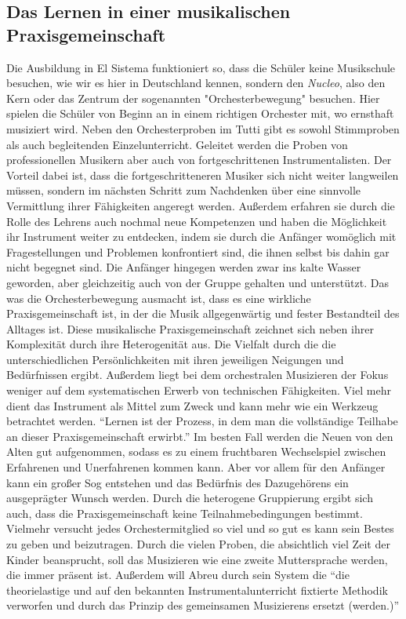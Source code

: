 \subsection{Das Lernen in einer musikalischen Praxisgemeinschaft}
Die Ausbildung in El Sistema funktioniert so, dass die Schüler keine Musikschule
besuchen, wie wir es hier in Deutschland kennen, sondern den \emph{Nucleo}, also den Kern oder das Zentrum der sogenannten "Orchesterbewegung" besuchen. Hier
spielen die Schüler von Beginn an in einem richtigen Orchester mit, wo
ernsthaft musiziert wird. Neben den Orchesterproben im Tutti gibt es sowohl
Stimmproben als auch begleitenden Einzelunterricht. Geleitet werden die Proben
von professionellen Musikern aber auch von fortgeschrittenen Instrumentalisten.
\autocite[45]{kaufmann:el_sistema} Der Vorteil dabei ist, dass die
fortgeschritteneren Musiker sich nicht weiter langweilen müssen, sondern im
nächsten Schritt zum Nachdenken über eine sinnvolle Vermittlung ihrer
Fähigkeiten angeregt werden. Außerdem erfahren sie durch die Rolle des Lehrens
auch nochmal neue Kompetenzen und haben die Möglichkeit ihr Instrument weiter zu
entdecken, indem sie durch die Anfänger womöglich mit Fragestellungen und
Problemen konfrontiert sind, die ihnen selbst bis dahin gar nicht begegnet sind.
Die Anfänger hingegen werden zwar ins kalte Wasser geworden, aber gleichzeitig
auch von der Gruppe gehalten und unterstützt.
Das was die Orchesterbewegung ausmacht ist, dass es eine wirkliche
Praxisgemeinschaft ist, in der die Musik allgegenwärtig und fester
Bestandteil des Alltages ist. Diese musikalische Praxisgemeinschaft zeichnet
sich neben ihrer Komplexität durch ihre Heterogenität aus. Die Vielfalt durch
die die unterschiedlichen Persönlichkeiten mit ihren jeweiligen Neigungen und
Bedürfnissen ergibt. %
Außerdem liegt bei dem orchestralen Musizieren der Fokus weniger auf dem
systematischen Erwerb von technischen Fähigkeiten. Viel mehr dient das
Instrument als Mittel zum Zweck und kann mehr wie ein Werkzeug betrachtet
werden. \enquote{Lernen ist der Prozess, in dem man die vollständige Teilhabe an dieser
Praxisgemeinschaft erwirbt.} Im besten Fall werden die Neuen von den Alten gut
aufgenommen, sodass es zu einem fruchtbaren Wechselspiel zwischen Erfahrenen und
Unerfahrenen kommen kann. Aber vor allem für den Anfänger kann ein großer Sog
entstehen und das Bedürfnis des Dazugehörens ein ausgeprägter Wunsch werden.
Durch die heterogene Gruppierung ergibt sich auch, dass die Praxisgemeinschaft
keine Teilnahmebedingungen bestimmt. Vielmehr versucht jedes Orchestermitglied
so viel und so gut es kann sein Bestes zu geben und beizutragen. Durch die
vielen Proben, die absichtlich viel Zeit der Kinder beansprucht, soll das
Musizieren wie eine zweite Muttersprache werden, die immer präsent ist.%
Außerdem will Abreu durch sein System die \enquote{die theorielastige und auf den
bekannten Instrumentalunterricht fixtierte Methodik verworfen und durch das
Prinzip des gemeinsamen Musizierens ersetzt (werden.)}
\autocite[45]{kaufmann:el_sistema}





